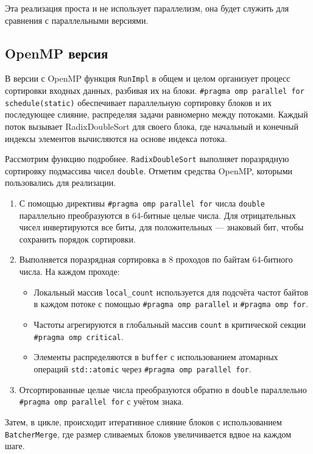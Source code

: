 \documentclass[12pt,a4paper]{extarticle}
\begin{document}
	Эта реализация проста и не использует параллелизм, она будет служить для сравнения с параллельными версиями.
	
	\subsection{OpenMP версия}
	В версии с OpenMP функция \texttt{RunImpl} в общем и целом организует процесс сортировки входных данных, разбивая их на блоки. \texttt{\#pragma omp parallel for schedule(static)} обеспечивает параллельную сортировку блоков и их последующее слияние, распределяя задачи равномерно между потоками.
	Каждый поток вызывает RadixDoubleSort для своего блока, где начальный и конечный индексы элементов вычисляются на основе индекса потока. 
	
	Рассмотрим функцию подробнее. \texttt{RadixDoubleSort} выполняет поразрядную сортировку подмассива чисел \texttt{double}. Отметим средства OpenMP, которыми пользовались для реализации.
	
	\begin{enumerate}
		\item С помощью директивы \texttt{\#pragma omp parallel for} числа \texttt{double} параллельно преобразуются в 64-битные целые числа. Для отрицательных чисел инвертируются все биты, для положительных --- знаковый бит, чтобы сохранить порядок сортировки.
		\item Выполняется поразрядная сортировка в 8 проходов по байтам 64-битного числа. На каждом проходе:
		\begin{itemize}
		\item Локальный массив \texttt{local\_count} используется для подсчёта частот байтов в каждом потоке с помощью \texttt{\#pragma omp parallel} и \texttt{\#pragma omp for}.
			\item Частоты агрегируются в глобальный массив \texttt{count} в критической секции \texttt{\#pragma omp critical}.
			\item Элементы распределяются в \texttt{buffer} с использованием атомарных операций \texttt{std::atomic} через \texttt{\#pragma omp parallel for}.
		\end{itemize}
		\item Отсортированные целые числа преобразуются обратно в \texttt{double} параллельно \texttt{\#pragma omp parallel for} с учётом знака.
	\end{enumerate}
	
	Затем, в цикле, происходит итеративное слияние блоков с использованием \texttt{BatcherMerge}, где размер сливаемых блоков увеличивается вдвое на каждом шаге.
	
\end{document}
